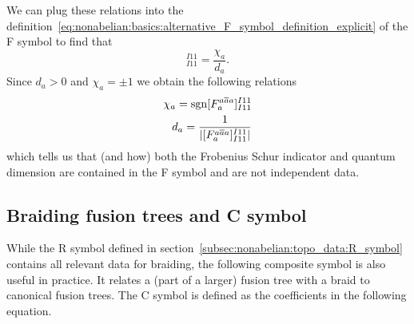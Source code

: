We can plug these relations into the definition~\eqref{eq:nonabelian:basics:alternative_F_symbol_definition_explicit} of the F symbol to find that
\begin{equation}
    [F^{a\dualsector{a}a}_{a}]^{I11}_{I11} = \frac{\chi_a}{d_a}
    .
\end{equation}
Since $d_a > 0$ and $\chi_a = \pm 1$ we obtain the following relations
\begin{align}
    \label{eq:nonabelian:topo_data:FrobeniusSchur_from_F}
    \chi_a = \mathrm{sgn} [F^{a\dualsector{a}a}_{a}]^{I11}_{I11}
    \\
    \label{eq:nonabelian:topo_data:qdim_from_F}
    d_a = \frac{1}{\abs{[F^{a\dualsector{a}a}_{a}]^{I11}_{I11}}}
\end{align}
which tells us that (and how) both the Frobenius Schur indicator and quantum dimension are contained in the F symbol and are not independent data.



\subsection{Braiding fusion trees and C symbol}
\label{subsec:nonabelian:topo_data:C_symbol}

While the R symbol defined in section~\ref{subsec:nonabelian:topo_data:R_symbol} contains all relevant data for braiding, the following composite symbol is also useful in practice.
%
It relates a (part of a larger) fusion tree with a braid to canonical fusion trees.
%
The C symbol is defined as the coefficients in the following equation.

